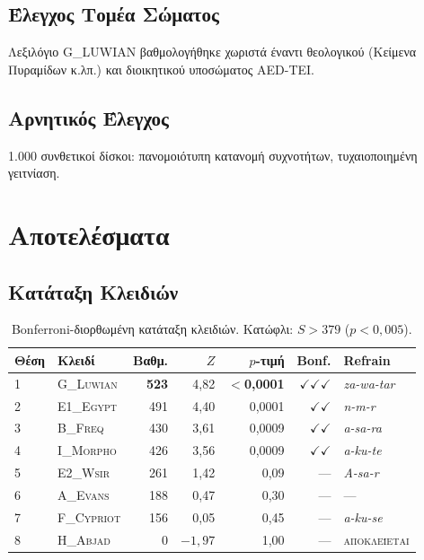 \documentclass[12pt,a4paper]{article}
\begin{document}
\subsection{Έλεγχος Τομέα Σώματος}
Λεξιλόγιο G\_LUWIAN βαθμολογήθηκε χωριστά έναντι θεολογικού (Κείμενα Πυραμίδων κ.λπ.) και διοικητικού υποσώματος AED-TEI.

\subsection{Αρνητικός Έλεγχος}
1.000 συνθετικοί δίσκοι: πανομοιότυπη κατανομή συχνοτήτων, τυχαιοποιημένη γειτνίαση.

\section{Αποτελέσματα}

\subsection{Κατάταξη Κλειδιών}

\begin{table}[h]
\centering
\caption{Bonferroni-διορθωμένη κατάταξη κλειδιών. Κατώφλι: $S > 379$ ($p < 0{,}005$).}
\begin{tabular}{llrrrrl}
\toprule
Θέση & Κλειδί & Βαθμ. & $Z$ & $p$-τιμή & Bonf. & Refrain \\
\midrule
1 & \textsc{G\_Luwian} & \textbf{523} & 4,82 & \textbf{$<$0,0001} & $\checkmark\checkmark\checkmark$ & \textit{za-wa-tar} \\
2 & \textsc{E1\_Egypt}  & 491 & 4,40 & 0,0001  & $\checkmark\checkmark$ & \textit{n-m-r} \\
3 & \textsc{B\_Freq}    & 430 & 3,61 & 0,0009  & $\checkmark\checkmark$ & \textit{a-sa-ra} \\
4 & \textsc{I\_Morpho}  & 426 & 3,56 & 0,0009  & $\checkmark\checkmark$ & \textit{a-ku-te} \\
5 & \textsc{E2\_Wsir}   & 261 & 1,42 & 0,09    & ---  & \textit{A-sa-r} \\
6 & \textsc{A\_Evans}   & 188 & 0,47 & 0,30    & ---  & --- \\
7 & \textsc{F\_Cypriot} & 156 & 0,05 & 0,45    & ---  & \textit{a-ku-se} \\
8 & \textsc{H\_Abjad}   & 0   & $-1{,}97$ & 1,00 & --- & \textsc{αποκλείεται} \\
\bottomrule
\end{tabular}
\end{table}
\end{document}
